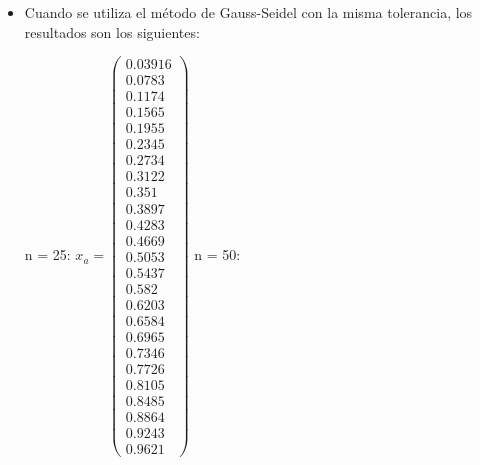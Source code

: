 \documentclass{udpreport}
\begin{document}
\begin{enumerate}
\begin {enumerate}
\begin{enumerate}
\begin{itemize}
				\item Cuando se utiliza el método de Gauss-Seidel con la misma tolerancia, los resultados son los siguientes:
				
				n = 25:
				$x_{a} = \left(\begin{array}{c} 0.03916\\ 0.0783\\ 0.1174\\ 0.1565\\ 0.1955\\ 0.2345\\ 0.2734\\ 0.3122\\ 0.351\\ 0.3897\\ 0.4283\\ 0.4669\\ 0.5053\\ 0.5437\\ 0.582\\ 0.6203\\ 0.6584\\ 0.6965\\ 0.7346\\ 0.7726\\ 0.8105\\ 0.8485\\ 0.8864\\ 0.9243\\ 0.9621 \end{array}\right)$
				n = 50:

\end{itemize}
\end{enumerate}
\end{enumerate}
\end{enumerate}
\end{document}
